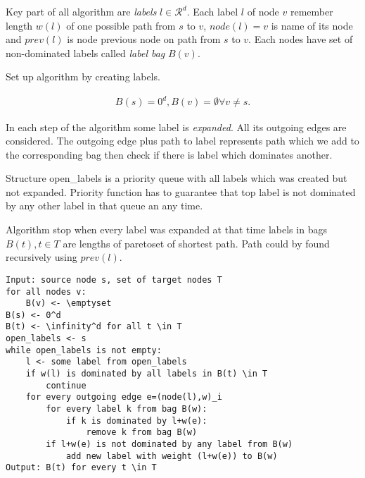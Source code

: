 Key part of all algorithm are \emph{labels} $l\in \mathcal{R}^d$.
Each label $l$ of node $v$ remember length $w(l)$  of one 
possible path from $s$ to $v$, $node(l) = v$ is name of its node
and $prev(l)$ is node previous node on path from $s$ to $v$.
Each nodes have set of non-dominated labels called \emph{label bag} $B(v)$.

Set up algorithm by creating labels.

\begin{gather*} 
B(s)=0^d, B(v)=\emptyset \forall v \ne s.
\end{gather*} 

In each step of the algorithm some label is \emph{expanded}. 
All its outgoing edges are considered. 
The outgoing edge plus path to label represents 
path which we add to the corresponding bag then check if there
is label which dominates another.

Structure open\_labels is a priority queue with all labels which was created but not expanded.
Priority function has to guarantee that top label is not dominated by any other label in that
queue an any time.

Algorithm stop when every label was expanded at that time
labels in bags $B(t), t \in T$ are lengths of paretoset of shortest path.
Path could by found recursively using $prev(l)$.


\begin{lstlisting}[caption={Meta Search Algorithm},label=list:8-6,captionpos=t,float,abovecaptionskip=-\medskipamount]
Input: source node s, set of target nodes T
for all nodes v:
	B(v) <- \emptyset
B(s) <- 0^d
B(t) <- \infinity^d for all t \in T
open_labels <- s
while open_labels is not empty:
	l <- some label from open_labels
    if w(l) is dominated by all labels in B(t) \in T
    	continue
    for every outgoing edge e=(node(l),w)_i
    	for every label k from bag B(w):
        	if k is dominated by l+w(e):
            	remove k from bag B(w)
        if l+w(e) is not dominated by any label from B(w)
        	add new label with weight (l+w(e)) to B(w)
Output: B(t) for every t \in T
\end{lstlisting}
